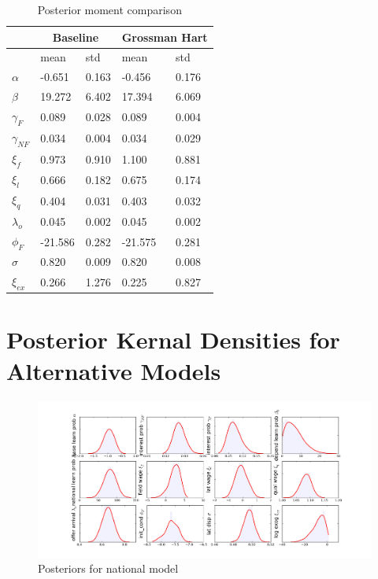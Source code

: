 \documentclass[]{article}
\makeatletter
\def\maxwidth{\ifdim\Gin@nat@width>\linewidth\linewidth
\else\Gin@nat@width\fi}
\let\Oldincludegraphics\includegraphics
\renewcommand{\includegraphics}[1]{\Oldincludegraphics[width=\maxwidth]{#1}}
\makeatother
\begin{document}
\begin{table}[h!]
    \centering
    \begin{tabular}{|l|l|l|l|l|}
        \hline
         & \multicolumn{2}{|c|}{Baseline}        & \multicolumn{2}{|c|}{Grossman Hart} \\ \hline\hline
                            & mean    & std   & mean       & std    \\ \hline
         $\alpha$           & -0.651  & 0.163 & -0.456     & 0.176  \\ \hline
         $\beta$            & 19.272  & 6.402 & 17.394     & 6.069  \\ \hline
         $\gamma_{F}$       & 0.089   & 0.028 & 0.089      & 0.004  \\ \hline
         $\gamma_{NF}$      & 0.034   & 0.004 & 0.034      & 0.029  \\ \hline
         $\xi_f$            & 0.973   & 0.910 & 1.100      & 0.881  \\ \hline
         $\xi_l$            & 0.666   & 0.182 & 0.675      & 0.174  \\ \hline
         $\xi_q$            & 0.404   & 0.031 & 0.403      & 0.032  \\ \hline
         $\lambda_o$        & 0.045   & 0.002 & 0.045      & 0.002  \\ \hline
         $\phi_F$           & -21.586 & 0.282 & -21.575    & 0.281  \\ \hline
         $\sigma$           & 0.820   & 0.009 & 0.820      & 0.008  \\ \hline
         $\xi_{ex}$         & 0.266   & 1.276 & 0.225      & 0.827  \\ \hline
    \end{tabular}
    \caption{Posterior moment comparison}
    \label{tab:post_comp}
\end{table}

\section{Posterior Kernal Densities for Alternative Models}
\label{sec:altmodels}

\begin{figure}[h!]
    \includegraphics{pics/params_dists_reg.png}
    \caption{Posteriors for national model}
\end{figure}
\end{document}

